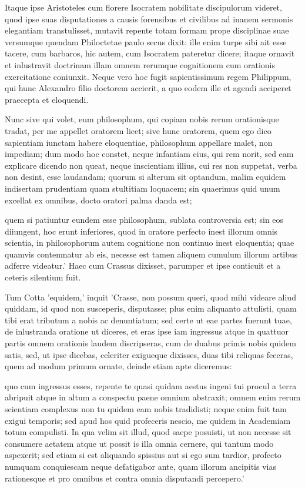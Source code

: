  Itaque ipse Aristoteles cum florere Isocratem nobilitate discipulorum videret, quod ipse suas disputationes a causis forensibus et civilibus ad inanem sermonis elegantiam transtulisset, mutavit repente totam formam prope disciplinae suae versumque quendam Philoctetae paulo secus dixit: ille enim turpe sibi ait esse tacere, cum barbaros, hic autem, cum Isocratem pateretur dicere; itaque ornavit et inlustravit doctrinam illam omnem rerumque cognitionem cum orationis exercitatione coniunxit. Neque vero hoc fugit sapientissimum regem Philippum, qui hunc Alexandro filio doctorem accierit, a quo eodem ille et agendi acciperet praecepta et eloquendi.

 Nunc sive qui volet, eum philosophum, qui copiam nobis rerum orationisque tradat, per me appellet oratorem licet; sive hunc oratorem, quem ego dico sapientiam iunctam habere eloquentiae, philosophum appellare malet, non impediam; dum modo hoc constet, neque infantiam eius, qui rem norit, sed eam explicare dicendo non queat, neque inscientiam illius, cui res non suppetat, verba non desint, esse laudandam; quorum si alterum sit optandum, malim equidem indisertam prudentiam quam stultitiam loquacem; sin quaerimus quid unum excellat ex omnibus, docto oratori palma danda est;

 quem si patiuntur eundem esse philosophum, sublata controversia est; sin eos diiungent, hoc erunt inferiores, quod in oratore perfecto inest illorum omnis scientia, in philosophorum autem cognitione non continuo inest eloquentia; quae quamvis contemnatur ab eis, necesse est tamen aliquem cumulum illorum artibus adferre videatur.' Haec cum Crassus dixisset, parumper et ipse conticuit et a ceteris silentium fuit.

 Tum Cotta 'equidem,' inquit 'Crasse, non possum queri, quod mihi videare aliud quiddam, id quod non susceperis, disputasse; plus enim aliquanto attulisti, quam tibi erat tributum a nobis ac denuntiatum; sed certe ut eae partes fuerunt tuae, de inlustranda oratione ut diceres, et eras ipse iam ingressus atque in quattuor partis omnem orationis laudem discripseras, cum de duabus primis nobis quidem satis, sed, ut ipse dicebas, celeriter exigueque dixisses, duas tibi reliquas feceras, quem ad modum primum ornate, deinde etiam apte diceremus:

 quo cum ingressus esses, repente te quasi quidam aestus ingeni tui procul a terra abripuit atque in altum a conspectu paene omnium abstraxit; omnem enim rerum scientiam complexus non tu quidem eam nobis tradidisti; neque enim fuit tam exigui temporis; sed apud hos quid profeceris nescio, me quidem in Academiam totum compulisti. In qua velim sit illud, quod saepe posuisti, ut non necesse sit consumere aetatem atque ut possit is illa omnia cernere, qui tantum modo aspexerit; sed etiam si est aliquando spissius aut si ego sum tardior, profecto numquam conquiescam neque defatigabor ante, quam illorum ancipitis vias rationesque et pro omnibus et contra omnia disputandi percepero.'

